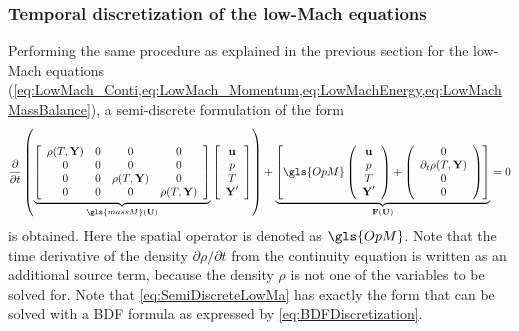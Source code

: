 \subsubsection{Temporal discretization of the low-Mach equations}
Performing the same procedure as explained in the previous section for the low-Mach equations (\cref{eq:LowMach_Conti,eq:LowMach_Momentum,eq:LowMachEnergy,eq:LowMachMassBalance}), a semi-discrete formulation of the form
\begin{equation}
	\frac{\partial}{\partial t} \left(
	\underbrace{	\left[ 
		\begin{array}{cccc}
			\rho(T,\vec{Y})&0&0&0\\
			0&0&0&0\\
			0&0&	\rho(T,\vec{Y})&0\\
			0&0&0&	\rho(T,\vec{Y})
		\end{array}
		\right]}_{\gls{massM}(\vectr{U})}
	\left[
	\begin{array}{cccc}
		\vec{u}\\
		p\\
		T\\
		\vec{Y}'
	\end{array}
	\right]
	\right)
	+
	\underbrace{	\left[ \gls{OpM}	\left(
		\begin{array}{cccc}
			\vec{u}\\
			p\\
			T\\
			\vec{Y}'
		\end{array}
		\right)
		+
		\left(
		\begin{array}{cccc}
			0\\
			\partial_t 	\rho(T,\vec{Y})\\
			0\\
			0
		\end{array}
		\right)
		\right]}_{\vec{F}(\vectr{U})} = 0 \label{eq:SemiDiscreteLowMa}
\end{equation} 
is obtained. Here the spatial operator is denoted as $\gls{OpM}$. Note that the time derivative of the density $\partial \rho /\partial t$ from the continuity equation is written as an additional source term, because the density $\rho$ is not one of the variables to be solved for. Note that \cref{eq:SemiDiscreteLowMa} has exactly the form that can be solved with a BDF formula as expressed by \cref{eq:BDFDiscretization}.

